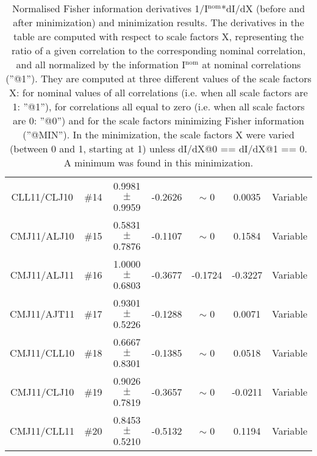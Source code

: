 \begin{table}[H]
\begin{center}
\begin{tabular}{|c|c|c|ccc|c|}
 {\tiny CLL11/CLJ10} & \#14 &    0.9981 $\pm$    0.9959 &   -0.2626 & {\tiny $\sim$ }0 &    0.0035 & Variable \\
 {\tiny CMJ11/ALJ10} & \#15 &    0.5831 $\pm$    0.7876 &   -0.1107 & {\tiny $\sim$ }0 &    0.1584 & Variable \\
 {\tiny CMJ11/ALJ11} & \#16 &    1.0000 $\pm$    0.6803 &   -0.3677 &   -0.1724 &   -0.3227 & Variable \\
 {\tiny CMJ11/AJT11} & \#17 &    0.9301 $\pm$    0.5226 &   -0.1288 & {\tiny $\sim$ }0 &    0.0071 & Variable \\
 {\tiny CMJ11/CLL10} & \#18 &    0.6667 $\pm$    0.8301 &   -0.1385 & {\tiny $\sim$ }0 &    0.0518 & Variable \\
 {\tiny CMJ11/CLJ10} & \#19 &    0.9026 $\pm$    0.7819 &   -0.3657 & {\tiny $\sim$ }0 &   -0.0211 & Variable \\
 {\tiny CMJ11/CLL11} & \#20 &    0.8453 $\pm$    0.5210 &   -0.5132 & {\tiny $\sim$ }0 &    0.1194 & Variable \\
\hline
\end{tabular}
\renewcommand{\arraystretch}{1}
\caption{Normalised Fisher information derivatives 1/I$^\mathrm{nom}$*dI/dX (before and after minimization) and minimization results.  The derivatives in the table are computed with respect to scale factors X, representing the ratio of a given correlation to the corresponding nominal correlation, and all normalized by the information I$^\mathrm{nom}$ at nominal correlations (''@1''). They are computed at three different values of the scale factors X: for nominal values of all correlations (i.e. when all scale factors are 1: ''@1''), for correlations all equal to zero (i.e. when all scale factors are 0: ''@0'') and for the scale factors minimizing Fisher information (''@MIN''). In the minimization, the scale factors X were varied (between 0 and 1, starting at 1) unless dI/dX@0 == dI/dX@1 == 0. A minimum was found in this minimization.}
\end{center}
\end{table}

